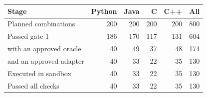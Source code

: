 \begin{tabular}{@{}lrrrrr@{}}
\toprule
Stage & Python & Java & C & C++ & All \\
\midrule
Planned combinations & 200 & 200 & 200 & 200 & 800 \\
Passed gate 1 & 186 & 170 & 117 & 131 & 604 \\
\quad with an approved oracle & 40 & 49 & 37 & 48 & 174 \\
\quad and an approved adapter & 40 & 33 & 22 & 35 & 130 \\
Executed in sandbox & 40 & 33 & 22 & 35 & 130 \\
Passed all checks & 40 & 33 & 22 & 35 & 130 \\
\bottomrule
\end{tabular}
